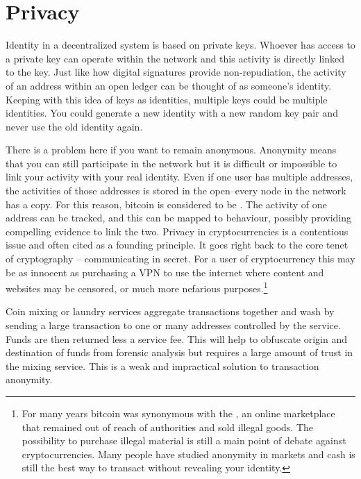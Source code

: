 \section{Privacy}\label{Se:Privacy}
Identity in a decentralized system is based on private keys. Whoever has access to a private key can operate within the network and this activity is directly linked to the key. Just like how digital signatures provide non-repudiation, the activity of an address within an open ledger can be thought of as someone's identity. Keeping with this idea of keys as identities, multiple keys could be multiple identities. You could generate a new identity with a new random key pair and never use the old identity again. 

There is a problem here if you want to remain anonymous. Anonymity means that you can still participate in the network but it is difficult or impossible to link your activity with your real identity. Even if one user has multiple addresses, the activities of those addresses is stored in the open--every node in the network has a copy. For this reason, bitcoin is considered to be . The activity of one address can be tracked, and this can be mapped to behaviour, possibly providing compelling evidence to link the two. Privacy in cryptocurrencies is a contentious issue and often cited as a founding principle. It goes right back to the core tenet of cryptography -- communicating in secret. For a user of cryptocurrency this may be as innocent as purchasing a VPN to use the internet where content and websites may be censored, or much more nefarious purposes.\footnote{For many years bitcoin was synonymous with the , an online marketplace that remained out of reach of authorities and sold illegal goods. The possibility to purchase illegal material is still a main point of debate against cryptocurrencies. Many people have studied anonymity in markets and cash is still the best way to transact without revealing your identity.}

Coin mixing or laundry services aggregate transactions together and wash by sending a large transaction to one or many addresses controlled by the service. Funds are then returned less a service fee. This will help to obfuscate origin and destination of funds from forensic analysis but requires a large amount of trust in the mixing service. This is a weak and impractical solution to transaction anonymity. 

